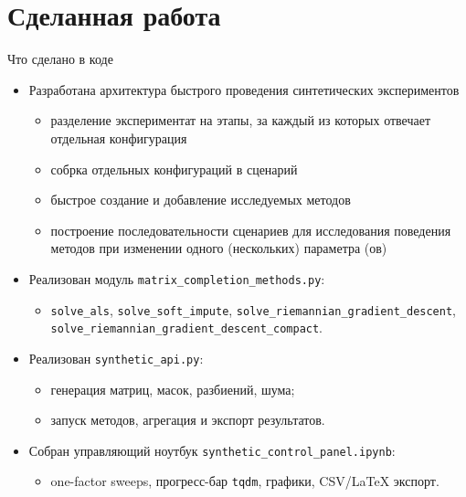 \documentclass[aspectratio=169,xcolor=dvipsnames]{beamer}
\begin{document}
\section{Сделанная работа}

\begin{frame}{Что сделано в коде}
    \begin{itemize}
        \item Разработана архитектура быстрого проведения синтетических экспериментов
              \begin{itemize}
                  \item разделение экспериментат на этапы, за каждый из которых отвечает отдельная конфигурация
                  \item собрка отдельных конфигураций в сценарий
                  \item быстрое создание и добавление исследуемых методов
                  \item построение последовательности сценариев для исследования поведения методов при изменении одного (нескольких) параметра (ов)
              \end{itemize}
        \item Реализован модуль \texttt{matrix\_completion\_methods.py}:
              \begin{itemize}
                  \item \texttt{solve\_als}, \texttt{solve\_soft\_impute}, \texttt{solve\_riemannian\_gradient\_descent}, \texttt{solve\_riemannian\_gradient\_descent\_compact}.
              \end{itemize}
        \item Реализован \texttt{synthetic\_api.py}:
              \begin{itemize}
                  \item генерация матриц, масок, разбиений, шума;
                  \item запуск методов, агрегация и экспорт результатов.
              \end{itemize}
        \item Собран управляющий ноутбук \texttt{synthetic\_control\_panel.ipynb}:
              \begin{itemize}
                  \item one-factor sweeps, прогресс-бар \texttt{tqdm}, графики, CSV/LaTeX экспорт.
              \end{itemize}
    \end{itemize}
\end{frame}
\end{document}
